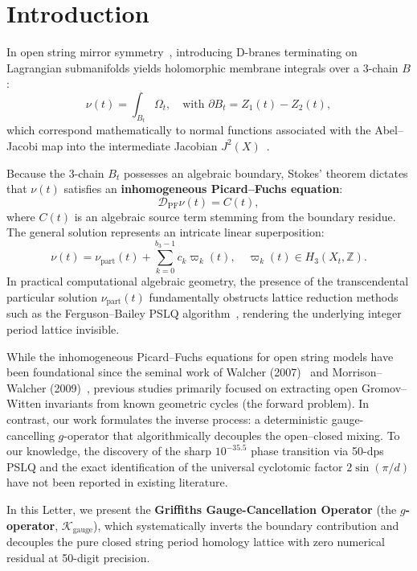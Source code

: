 \documentclass[11pt,a4paper]{article}
\theoremstyle{definition}
\begin{document}
\section{Introduction}

In open string mirror symmetry~\cite{Walcher2007,MorrisonWalcher2009}, introducing D-branes terminating on Lagrangian submanifolds yields holomorphic membrane integrals over a 3-chain $B$:
\begin{equation}
\nu(t) = \int_{B_t} \Omega_t, \quad \text{with } \partial B_t = Z_1(t) - Z_2(t),
\end{equation}
which correspond mathematically to normal functions associated with the Abel--Jacobi map into the intermediate Jacobian $J^2(X)$~\cite{Griffiths1969,Voisin2002}.

Because the 3-chain $B_t$ possesses an algebraic boundary, Stokes' theorem dictates that $\nu(t)$ satisfies an \textbf{inhomogeneous Picard--Fuchs equation}:
\begin{equation}
\mathcal{D}_{\text{PF}} \nu(t) = C(t),
\end{equation}
where $C(t)$ is an algebraic source term stemming from the boundary residue. The general solution represents an intricate linear superposition:
\begin{equation}
\nu(t) = \nu_{\text{part}}(t) + \sum_{k=0}^{b_3-1} c_k \varpi_k(t), \quad \varpi_k(t) \in H_3(X_t, \mathbb{Z}).
\end{equation}
In practical computational algebraic geometry, the presence of the transcendental particular solution $\nu_{\text{part}}(t)$ fundamentally obstructs lattice reduction methods such as the Ferguson--Bailey PSLQ algorithm~\cite{FergusonBailey1992}, rendering the underlying integer period lattice invisible. 

While the inhomogeneous Picard--Fuchs equations for open string models have been foundational since the seminal work of Walcher (2007)~\cite{Walcher2007} and Morrison--Walcher (2009)~\cite{MorrisonWalcher2009}, previous studies primarily focused on extracting open Gromov--Witten invariants from known geometric cycles (the forward problem). In contrast, our work formulates the inverse process: a deterministic gauge-cancelling $g$-operator that algorithmically decouples the open--closed mixing. To our knowledge, the discovery of the sharp $10^{-35.5}$ phase transition via 50-dps PSLQ and the exact identification of the universal cyclotomic factor $2\sin(\pi/d)$ have not been reported in existing literature.

In this Letter, we present the \textbf{Griffiths Gauge-Cancellation Operator} (the \textbf{$g$-operator}, $\mathcal{K}_{\text{gauge}}$), which systematically inverts the boundary contribution and decouples the pure closed string period homology lattice with zero numerical residual at 50-digit precision.
\end{document}
